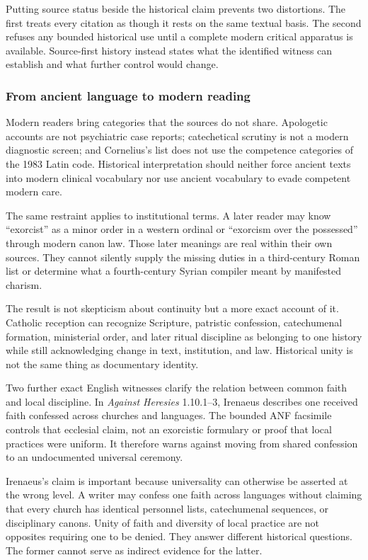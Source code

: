 Putting source status beside the historical claim prevents two distortions.
The first treats every citation as though it rests on the same textual basis.
The second refuses any bounded historical use until a complete modern
critical apparatus is available. Source-first history instead states what the
identified witness can establish and what further control would change.

\subsubsection{From ancient language to modern reading}

Modern readers bring categories that the sources do not share. Apologetic
accounts are not psychiatric case reports; catechetical scrutiny is not a
modern diagnostic screen; and Cornelius's list does not use the competence
categories of the 1983 Latin code. Historical interpretation should neither
force ancient texts into modern clinical vocabulary nor use ancient
vocabulary to evade competent modern care.

The same restraint applies to institutional terms. A later reader may know
``exorcist'' as a minor order in a western ordinal or ``exorcism over the
possessed'' through modern canon law. Those later meanings are real within
their own sources. They cannot silently supply the missing duties in a
third-century Roman list or determine what a fourth-century Syrian compiler
meant by manifested charism.

The result is not skepticism about continuity but a more exact account of it.
Catholic reception can recognize Scripture, patristic confession,
catechumenal formation, ministerial order, and later ritual discipline as
belonging to one history while still acknowledging change in text,
institution, and law. Historical unity is not the same thing as documentary
identity.

Two further exact English witnesses clarify the relation between common faith
and local discipline. In \emph{Against Heresies} 1.10.1--3, Irenaeus describes
one received faith confessed across churches and languages. The bounded ANF
facsimile controls that ecclesial claim, not an exorcistic formulary or proof
that local practices were uniform. It therefore warns against moving from
shared confession to an undocumented universal ceremony.

Irenaeus's claim is important because universality can otherwise be asserted
at the wrong level. A writer may confess one faith across languages without
claiming that every church has identical personnel lists, catechumenal
sequences, or disciplinary canons. Unity of faith and diversity of local
practice are not opposites requiring one to be denied. They answer different
historical questions. The former cannot serve as indirect evidence for the
latter.

